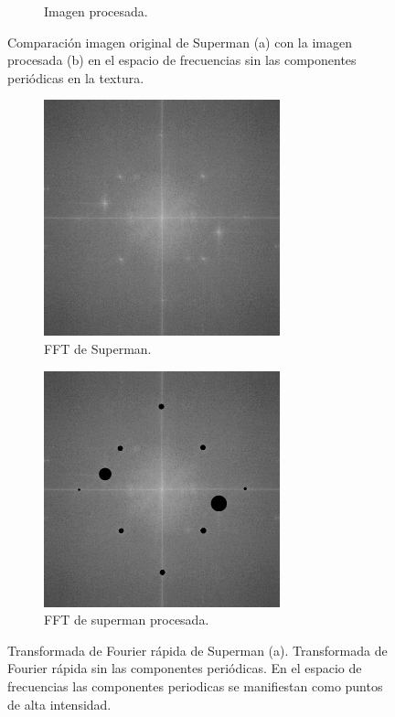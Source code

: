 \documentclass[letterpaper,12pt]{article}
\theoremstyle{plain}
\begin{document}
\begin{figure}[H]
\begin{subfigure}[h]{0.49\textwidth}
            \caption{Imagen procesada.}
         \end{subfigure}
    \caption{Comparación imagen original de Superman (a) con la imagen procesada (b) en el espacio de frecuencias sin las componentes periódicas en la textura.}
    \label{fig:superman}
\end{figure}


\begin{figure}[H]
    \centering
         \begin{subfigure}[h]{0.49\textwidth}
            \centering
            \includegraphics[width=0.75\textwidth]{Figuras/FFT of superman.png}
            \caption{FFT de Superman.} 
         \end{subfigure}
         \begin{subfigure}[h]{0.49\textwidth}
            \centering
            \includegraphics[width=0.75\textwidth]{Figuras/FFT of superman_process.png}
            \caption{FFT de superman procesada.}
         \end{subfigure}
    \caption{Transformada de Fourier rápida de Superman (a). Transformada de Fourier rápida sin las componentes periódicas. En el espacio de frecuencias las componentes periodicas se manifiestan como puntos de alta intensidad.}
    \label{fig:supermanfft}
\end{figure}
\end{document}
